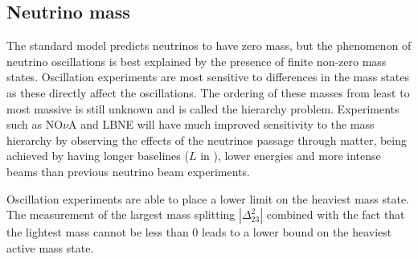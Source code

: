 %


\subsection{Neutrino mass}
\label{section:particle-physics:neutrino:mass}

The standard model predicts neutrinos to have zero mass, but the phenomenon of neutrino oscillations is best explained by the presence of finite non-zero mass states. Oscillation experiments are most sensitive to differences in the mass states as these directly affect the oscillations. The ordering of these masses from least to most massive is still unknown and is called the hierarchy problem. Experiments such as NO$\nu$A and LBNE will have much improved sensitivity to the mass hierarchy by observing the effects of the neutrinos passage through matter, being achieved by having longer baselines ($L$ in ), lower energies and more intense beams than previous neutrino beam experiments.

Oscillation experiments are able to place a lower limit on the heaviest mass state. The measurement of the largest mass splitting $|\Delta_{23}^{2}|$ combined with the fact that the lightest mass cannot be less than 0 leads to a lower bound on the heaviest active mass state.


